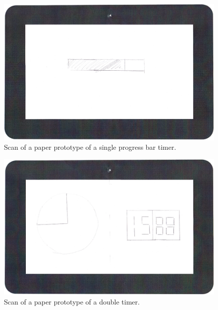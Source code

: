 	\begin{figure}[H]
		\centering
			\includegraphics[width=\textwidth]{Images/paper_prototype/timer_1.png}
				\caption{Scan of a paper prototype of a single progress bar timer.}
		\label{fig:pap_prot_progbar}
	\end{figure}
	
	\begin{figure}[H]
		\centering
			\includegraphics[width=\textwidth]{Images/paper_prototype/timer_2.png}
				\caption{Scan of a paper prototype of a double timer.}
		\label{fig:pap_prot_timedoub1}
	\end{figure}

